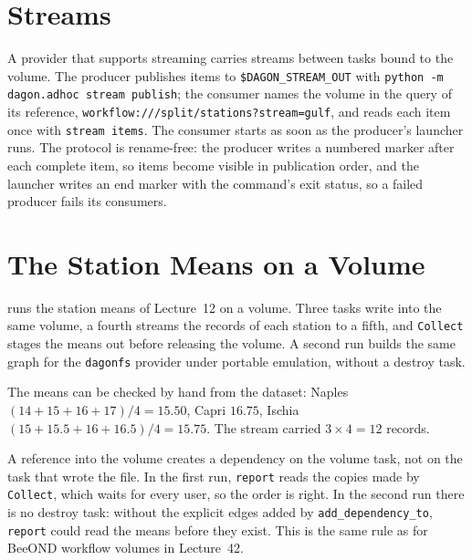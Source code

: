 \section{Streams}

\begin{sloppypar}
A provider that supports streaming carries streams between tasks bound to the
volume. The producer publishes items to \texttt{\$DAGON\_STREAM\_OUT} with
\texttt{python -m dagon.adhoc stream publish}; the consumer names the volume in
the query of its reference, \texttt{workflow:///split/stations?stream=gulf},
and reads each item once with \texttt{stream items}. The consumer starts as
soon as the producer's launcher runs. The protocol is rename-free: the producer
writes a numbered marker after each complete item, so items become visible in
publication order, and the launcher writes an end marker with the command's
exit status, so a failed producer fails its consumers.
\end{sloppypar}

\section{The Station Means on a Volume}

 runs the station means of Lecture~12 on a volume. Three
tasks write into the same volume, a fourth streams the records of each station
to a fifth, and \texttt{Collect} stages the means out before releasing the
volume. A second run builds the same graph for the \texttt{dagonfs} provider
under portable emulation, without a destroy task.





The means can be checked by hand from the dataset: Naples
$(14+15+16+17)/4 = 15.50$, Capri $16.75$, Ischia $(15+15.5+16+16.5)/4 = 15.75$.
The stream carried $3 \times 4 = 12$ records.

\begin{cautionbox}
A reference into the volume creates a dependency on the volume task, not on
the task that wrote the file. In the first run, \texttt{report} reads the
copies made by \texttt{Collect}, which waits for every user, so the order is
right. In the second run there is no destroy task: without the explicit edges
added by \texttt{add\_dependency\_to}, \texttt{report} could read the means
before they exist. This is the same rule as for BeeOND workflow volumes in
Lecture~42.
\end{cautionbox}

